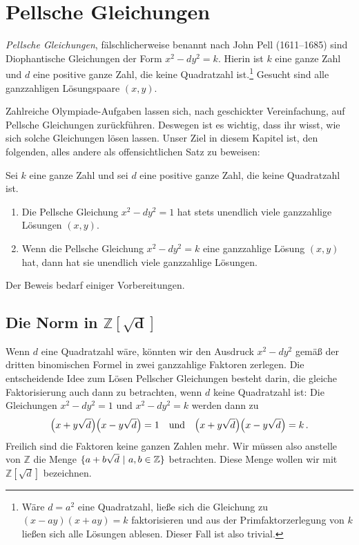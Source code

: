 \section{Pellsche Gleichungen}\label{kapitel:Pell}
\emph{Pellsche Gleichungen}, fälschlicherweise benannt nach John Pell (1611--1685) sind Diophantische Gleichungen der Form $x^2-dy^2=k$. Hierin ist $k$ eine ganze Zahl und $d$ eine positive ganze Zahl, die keine Quadratzahl ist.\footnote{Wäre $d=a^2$ eine Quadratzahl, ließe sich die Gleichung zu $(x-ay)(x+ay)=k$ faktorisieren und aus der Primfaktorzerlegung von $k$ ließen sich alle Lösungen ablesen. Dieser Fall ist also trivial.} Gesucht sind alle ganzzahligen Lösungspaare $(x,y)$.

Zahlreiche Olympiade-Aufgaben lassen sich, nach geschickter Vereinfachung, auf Pellsche Gleichungen zurückführen. Deswegen ist es wichtig, dass ihr wisst, wie sich solche Gleichungen lösen lassen. Unser Ziel in diesem Kapitel ist, den folgenden, alles andere als offensichtlichen Satz zu beweisen:
\begin{satzmitnamen}
	Sei $k$ eine ganze Zahl und sei $d$ eine positive ganze Zahl, die keine Quadratzahl ist.
	\begin{enumerate}[label={$(\alph*)$},ref={$(\alph*)$}]
		\item Die Pellsche Gleichung $x^2-dy^2=1$ hat stets unendlich viele ganzzahlige Lösungen $(x,y)$.
		\item Wenn die Pellsche Gleichung $x^2-dy^2=k$ eine ganzzahlige Lösung $(x,y)$ hat, dann hat sie unendlich viele ganzzahlige Lösungen.
	\end{enumerate}
\end{satzmitnamen}
Der Beweis bedarf einiger Vorbereitungen.

\subsection*{Die Norm in $\boldsymbol{\mathbb Z[\sqrt{d}]}$}
Wenn $d$ eine Quadratzahl wäre, könnten wir den Ausdruck $x^2-dy^2$ gemäß der dritten binomischen Formel in zwei ganzzahlige Faktoren zerlegen. Die entscheidende Idee zum Lösen Pellscher Gleichungen besteht darin, die gleiche Faktorisierung auch dann zu betrachten, wenn $d$ keine Quadratzahl ist: Die Gleichungen $x^2-dy^2=1$ und $x^2-dy^2=k$ werden dann zu
\begin{equation*}
	\parens*{x+y\sqrt{d}}\parens*{x-y\sqrt{d}}=1\quad\text{und}\quad \parens*{x+y\sqrt{d}}\parens*{x-y\sqrt{d}}=k\,.
\end{equation*}
Freilich sind die Faktoren keine ganzen Zahlen mehr. Wir müssen also anstelle von $\mathbb Z$ die Menge $\braces{a+b\sqrt{d}\ |\ a,b\in\mathbb Z}$ betrachten. Diese Menge wollen wir mit $\mathbb Z[\sqrt{d}]$ bezeichnen. 

